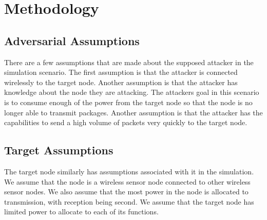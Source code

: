 \section{Methodology}
\subsection{Adversarial Assumptions}
There are a few assumptions that are made about the supposed attacker in the simulation scenario.  The first assumption is that the attacker is connected wirelessly to the target node. Another assumption is that the attacker has knowledge about the node they are attacking. The attackers goal in this scenario is to consume enough of the power from the target node so that the node is no longer able to transmit packages.  Another assumption is that the attacker has the capabilities to send a high volume of packets very quickly to the target node.
\subsection{Target Assumptions}
The target node similarly has assumptions associated with it in the simulation.  We assume that the node is a wireless sensor node connected to other wireless sensor nodes.  We also assume that the most power in the node is allocated to transmission, with reception being second.  We assume that the target node has limited power to allocate to each of its functions.
